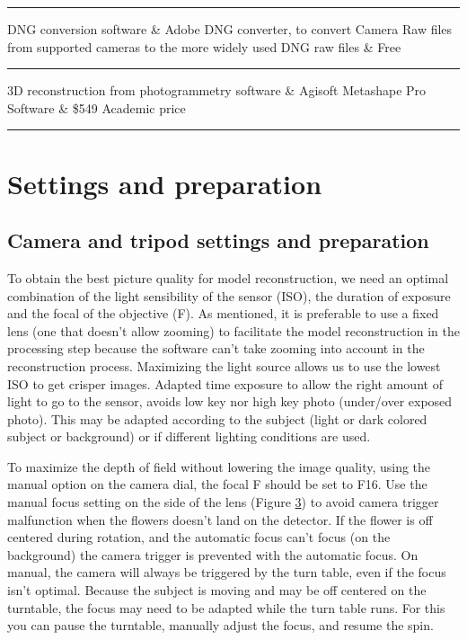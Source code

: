 \documentclass[
]{book}
\begin{document}
\begin{center}\rule{0.5\linewidth}{0.5pt}\end{center}

DNG conversion software \& Adobe DNG converter, to convert Camera Raw
files from supported cameras to the more widely used DNG raw files \&
Free\\

\begin{center}\rule{0.5\linewidth}{0.5pt}\end{center}

\hfill\break
3D reconstruction from photogrammetry software \& Agisoft Metashape Pro
Software \& \$549 Academic price\\

\begin{center}\rule{0.5\linewidth}{0.5pt}\end{center}

\hypertarget{settings-and-preparation}{%
\chapter{Settings and preparation}\label{settings-and-preparation}}

\hypertarget{camera-and-tripod-settings-and-preparation}{%
\section{Camera and tripod settings and preparation}\label{camera-and-tripod-settings-and-preparation}}

To obtain the best picture quality for model reconstruction, we need an
optimal combination of the light sensibility of the sensor (ISO), the
duration of exposure and the focal of the objective (F). As mentioned,
it is preferable to use a fixed lens (one that doesn't allow zooming) to
facilitate the model reconstruction in the processing step because the
software can't take zooming into account in the reconstruction process.
Maximizing the light source allows us to use the lowest ISO to get
crisper images. Adapted time exposure to allow the right amount of light
to go to the sensor, avoids low key nor high key photo (under/over
exposed photo). This may be adapted according to the subject (light or
dark colored subject or background) or if different lighting conditions
are used.

To maximize the depth of field without lowering the image quality, using
the manual option on the camera dial, the focal F should be set to F16.
Use the manual focus setting on the side of the lens (Figure
\protect\hyperlink{camera_arrows}{3}) to
avoid camera trigger malfunction when the flowers doesn't land on the
detector. If the flower is off centered during rotation, and the
automatic focus can't focus (on the background) the camera trigger is
prevented with the automatic focus. On manual, the camera will always be
triggered by the turn table, even if the focus isn't optimal. Because
the subject is moving and may be off centered on the turntable, the
focus may need to be adapted while the turn table runs. For this you can
pause the turntable, manually adjust the focus, and resume the spin.
\end{document}

